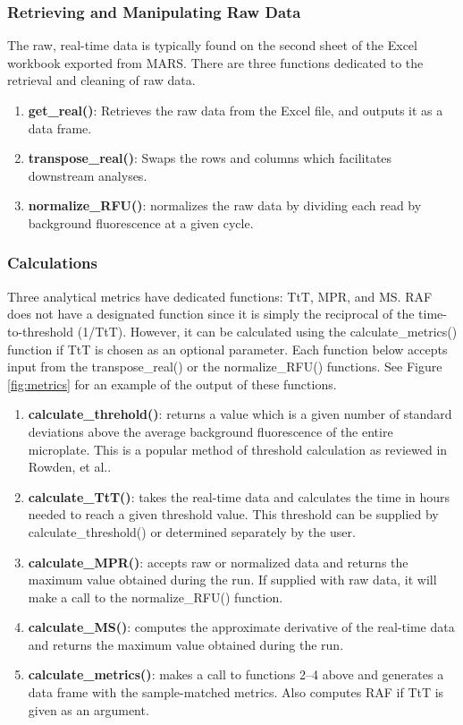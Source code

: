 \documentclass[preprint,12pt,a4paper]{elsarticle}
\begin{document}
\subsubsection{Retrieving and Manipulating Raw Data}
The raw, real-time data is typically found on the second sheet of the Excel workbook exported from MARS. There are three functions dedicated to the retrieval and cleaning of raw data.

\begin{enumerate}
\item \textbf{get\_real()}: Retrieves the raw data from the Excel file, and outputs it as a data frame.
\item \textbf{transpose\_real()}: Swaps the rows and columns which facilitates downstream analyses.
\item \textbf{normalize\_RFU()}: normalizes the raw data by dividing each read by background fluorescence at a given cycle.
\end{enumerate}

\subsubsection{Calculations}
Three analytical metrics have dedicated functions: TtT, MPR, and MS. RAF does not have a designated function since it is simply the reciprocal of the time-to-threshold (1/TtT). However, it can be calculated using the calculate\_metrics() function if TtT is chosen as an optional parameter. Each function below accepts input from the transpose\_real() or the normalize\_RFU() functions. See Figure \ref{fig:metrics} for an example of the output of these functions.

\begin{enumerate}
\item \textbf{calculate\_threhold()}: returns a value which is a given number of standard deviations above the average background fluorescence of the entire microplate. This is a popular method of threshold calculation as reviewed in Rowden, et al.\cite{Rowden2023}.
\item \textbf{calculate\_TtT()}: takes the real-time data and calculates the time in hours needed to reach a given threshold value. This threshold can be supplied by calculate\_threshold() or determined separately by the user.
\item \textbf{calculate\_MPR()}: accepts raw or normalized data and returns the maximum value obtained during the run. If supplied with raw data, it will make a call to the normalize\_RFU() function.
\item \textbf{calculate\_MS()}: computes the approximate derivative of the real-time data and returns the maximum value obtained during the run.
\item \textbf{calculate\_metrics()}: makes a call to functions 2--4 above and generates a data frame with the sample-matched metrics. Also computes RAF if TtT is given as an argument.
\end{enumerate}
\end{document}
